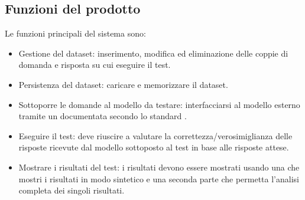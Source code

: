 
\subsection{Funzioni del prodotto}
Le funzioni principali del sistema sono:
\begin{itemize}
    \item Gestione del dataset: inserimento, modifica ed eliminazione delle coppie di domanda e risposta su cui eseguire il test.
    \item Persistenza del dataset: caricare e memorizzare il dataset.
    \item Sottoporre le domande al modello da testare: interfacciarsi al modello esterno tramite un  documentata secondo lo standard .
    \item Eseguire il test: deve riuscire a valutare la correttezza/verosimiglianza delle risposte ricevute dal modello sottoposto al test in base alle risposte attese.
    \item Mostrare i risultati del test: i risultati devono essere mostrati usando una  che mostri i risultati in modo sintetico e una seconda parte che permetta l'analisi completa dei singoli risultati.
\end{itemize}